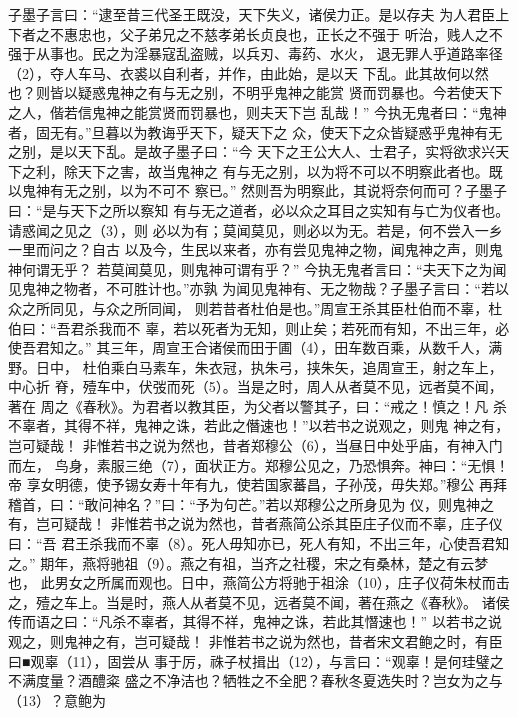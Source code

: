 \documentclass[12pt,UTF8]{ctexbook}
\begin{document}
子墨子言曰：“逮至昔三代圣王既没，天下失义，诸侯力正。是以存夫 
为人君臣上下者之不惠忠也，父子弟兄之不慈孝弟长贞良也，正长之不强于 
听治，贱人之不强于从事也。民之为淫暴寇乱盗贼，以兵刃、毒药、水火， 
退无罪人乎道路率径（2），夺人车马、衣裘以自利者，并作，由此始，是以天 
下乱。此其故何以然也？则皆以疑惑鬼神之有与无之别，不明乎鬼神之能赏 
贤而罚暴也。今若使天下之人，偕若信鬼神之能赏贤而罚暴也，则夫天下岂 
乱哉！” 
今执无鬼者曰：“鬼神者，固无有。”旦暮以为教诲乎天下，疑天下之 
众，使天下之众皆疑惑乎鬼神有无之别，是以天下乱。是故子墨子曰：“今 
天下之王公大人、士君子，实将欲求兴天下之利，除天下之害，故当鬼神之 
有与无之别，以为将不可以不明察此者也。既以鬼神有无之别，以为不可不 
察已。” 
然则吾为明察此，其说将奈何而可？子墨子曰：“是与天下之所以察知 
有与无之道者，必以众之耳目之实知有与亡为仪者也。请惑闻之见之（3），则 
必以为有；莫闻莫见，则必以为无。若是，何不尝入一乡一里而问之？自古 
以及今，生民以来者，亦有尝见鬼神之物，闻鬼神之声，则鬼神何谓无乎？ 
若莫闻莫见，则鬼神可谓有乎？” 
今执无鬼者言曰：“夫天下之为闻见鬼神之物者，不可胜计也。”亦孰 
为闻见鬼神有、无之物哉？子墨子言曰：“若以众之所同见，与众之所同闻， 
则若昔者杜伯是也。”周宣王杀其臣杜伯而不辜，杜伯曰：“吾君杀我而不 
辜，若以死者为无知，则止矣；若死而有知，不出三年，必使吾君知之。” 
其三年，周宣王合诸侯而田于圃（4），田车数百乘，从数千人，满野。日中， 
杜伯乘白马素车，朱衣冠，执朱弓，挟朱矢，追周宣王，射之车上，中心折 
脊，殪车中，伏弢而死（5）。当是之时，周人从者莫不见，远者莫不闻，著在 
周之《春秋》。为君者以教其臣，为父者以警其子，曰：“戒之！慎之！凡 
杀不辜者，其得不祥，鬼神之诛，若此之僭速也！”以若书之说观之，则鬼 
神之有，岂可疑哉！ 
非惟若书之说为然也，昔者郑穆公（6），当昼日中处乎庙，有神入门而左， 
鸟身，素服三绝（7），面状正方。郑穆公见之，乃恐惧奔。神曰：“无惧！帝 
享女明德，使予锡女寿十年有九，使若国家蕃昌，子孙茂，毋失郑。”穆公 
再拜稽首，曰：“敢问神名？”曰：“予为句芒。”若以郑穆公之所身见为 
仪，则鬼神之有，岂可疑哉！ 
非惟若书之说为然也，昔者燕简公杀其臣庄子仪而不辜，庄子仪曰：“吾 
君王杀我而不辜（8）。死人毋知亦已，死人有知，不出三年，心使吾君知之。” 
期年，燕将驰祖（9）。燕之有祖，当齐之社稷，宋之有桑林，楚之有云梦也， 
此男女之所属而观也。日中，燕简公方将驰于祖涂（10），庄子仪荷朱杖而击 
之，殪之车上。当是时，燕人从者莫不见，远者莫不闻，著在燕之《春秋》。 
诸侯传而语之曰：“凡杀不辜者，其得不祥，鬼神之诛，若此其憯速也！” 
以若书之说观之，则鬼神之有，岂可疑哉！ 
非惟若书之说为然也，昔者宋文君鲍之时，有臣曰■观辜（11），固尝从 
事于厉，祩子杖揖出（12），与言曰：“观辜！是何珪璧之不满度量？酒醴粢 
盛之不净洁也？牺牲之不全肥？春秋冬夏选失时？岂女为之与（13）？意鲍为 
\end{document}
